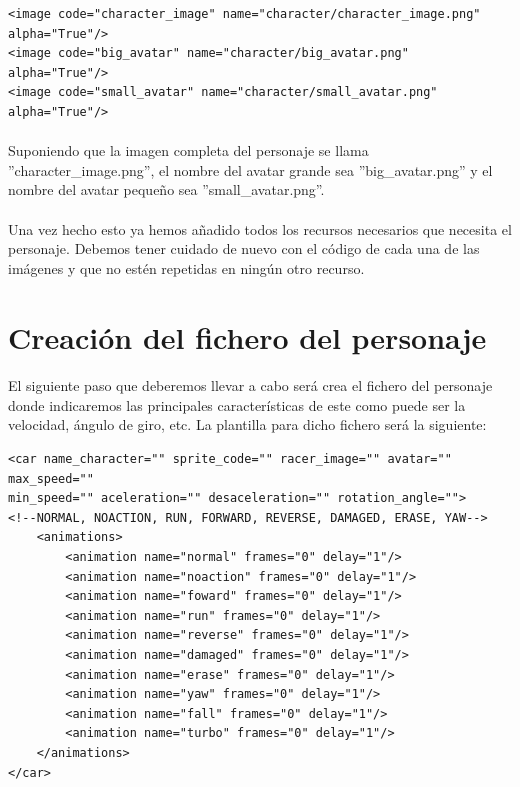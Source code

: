 \begin{lstlisting}[style=XML]
<image code="character_image" name="character/character_image.png" alpha="True"/>
<image code="big_avatar" name="character/big_avatar.png" alpha="True"/>
<image code="small_avatar" name="character/small_avatar.png" alpha="True"/>
\end{lstlisting}

\paragraph{}
Suponiendo que la imagen completa del personaje se llama ''character\_image.png'', el nombre del avatar grande sea 
''big\_avatar.png'' y el nombre del avatar pequeño sea ''small\_avatar.png''.

\paragraph{}
Una vez hecho esto ya hemos añadido todos los recursos necesarios que necesita el personaje. Debemos tener cuidado de nuevo con el
código de cada una de las imágenes y que no estén repetidas en ningún otro recurso.

\section{Creación del fichero del personaje}

\paragraph{}
El siguiente paso que deberemos llevar a cabo será crea el fichero del personaje donde indicaremos las principales características
de este como puede ser la velocidad, ángulo de giro, etc. La plantilla para dicho fichero será la siguiente:

\begin{lstlisting}[style=XML]
<car name_character="" sprite_code="" racer_image="" avatar="" max_speed="" 
min_speed="" aceleration="" desaceleration="" rotation_angle="">
<!--NORMAL, NOACTION, RUN, FORWARD, REVERSE, DAMAGED, ERASE, YAW-->
    <animations>
        <animation name="normal" frames="0" delay="1"/>
        <animation name="noaction" frames="0" delay="1"/>
        <animation name="foward" frames="0" delay="1"/>
        <animation name="run" frames="0" delay="1"/>
        <animation name="reverse" frames="0" delay="1"/>
        <animation name="damaged" frames="0" delay="1"/>
        <animation name="erase" frames="0" delay="1"/>
        <animation name="yaw" frames="0" delay="1"/>
        <animation name="fall" frames="0" delay="1"/>
        <animation name="turbo" frames="0" delay="1"/>
    </animations>
</car>
\end{lstlisting}

